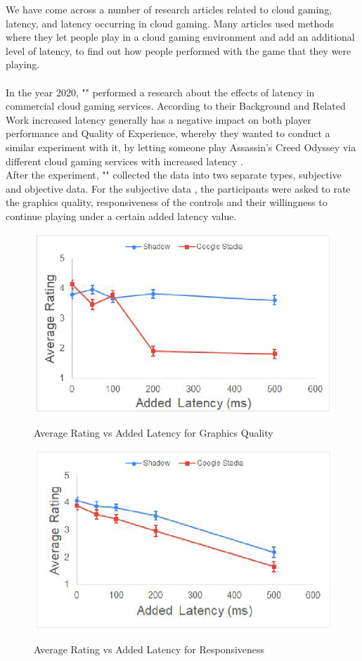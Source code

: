 We have come across a number of research articles related to cloud gaming, latency, and latency occurring in cloud gaming. Many articles used methods where they let people play in a cloud gaming environment and add an additional level of latency, to find out how people performed with the game that they were playing. 
\\\\
In the year 2020, "\citeauthor{desveaux2020effects}" performed a research about the effects of latency in commercial cloud gaming services. According to their Background and Related Work \parencite[Section 2.3, Page 17]{desveaux2020effects} increased latency generally has a negative impact on both player performance and Quality of Experience, whereby they wanted to conduct a similar experiment with it, by letting someone play Assassin's Creed Odyssey via different cloud gaming services with increased latency \parencite[Chapter 3, Page 18]{desveaux2020effects}.\\
After the experiment, "\citeauthor{desveaux2020effects}" collected the data into two separate types, subjective and objective data. For the subjective data \parencite[Section 4.2.2, Page 36]{desveaux2020effects}, the participants were asked to rate the graphics quality, responsiveness of the controls and their willingness to continue playing under a certain added latency value.
\begin{figure}[H]
	\centering
	\includegraphics[width=12cm]{../img/fig13.png}
	\caption{Average Rating vs Added Latency for Graphics Quality}
	\parencite[Section 4.2.2, Page 36, Figure 13]{desveaux2020effects}
\end{figure}
\begin{figure}[H]
	\centering
	\includegraphics[width=12cm]{../img/fig14.png}
	\caption{Average Rating vs Added Latency for Responsiveness}
	\parencite[Section 4.2.2, Page 37, Figure 14]{desveaux2020effects}
\end{figure}
